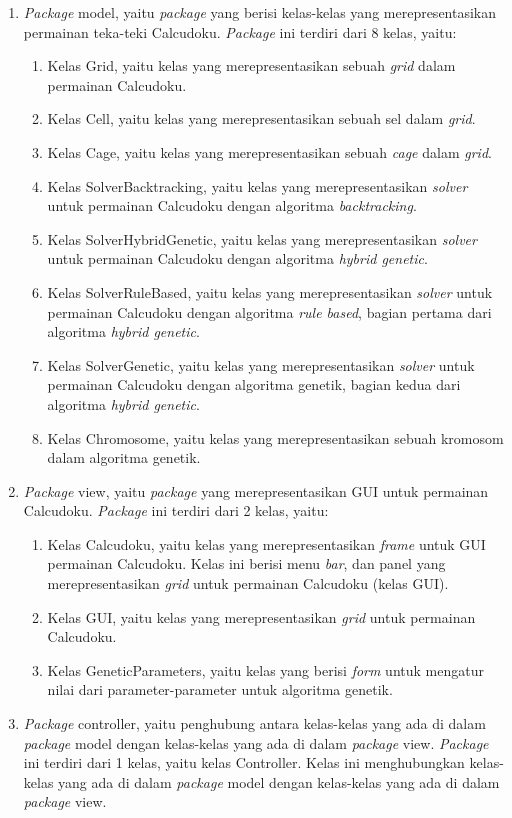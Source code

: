 \begin{enumerate}
\item \textit{Package} model, yaitu \textit{package} yang berisi kelas-kelas yang merepresentasikan permainan teka-teki Calcudoku. \textit{Package} ini terdiri dari 8 kelas, yaitu:
	\begin{enumerate}
	\item Kelas Grid, yaitu kelas yang merepresentasikan sebuah \textit{grid} dalam permainan Calcudoku.
	\item Kelas Cell, yaitu kelas yang merepresentasikan sebuah sel dalam \textit{grid}.
	\item Kelas Cage, yaitu kelas yang merepresentasikan sebuah \textit{cage} dalam \textit{grid}.
	\item Kelas SolverBacktracking, yaitu kelas yang merepresentasikan \textit{solver} untuk permainan Calcudoku dengan algoritma \textit{backtracking}.
	\item Kelas SolverHybridGenetic, yaitu kelas yang merepresentasikan \textit{solver} untuk permainan Calcudoku dengan algoritma \textit{hybrid genetic}.
	\item Kelas SolverRuleBased, yaitu kelas yang merepresentasikan \textit{solver} untuk permainan Calcudoku dengan algoritma \textit{rule based}, bagian pertama dari algoritma \textit{hybrid genetic}.
	\item Kelas SolverGenetic, yaitu kelas yang merepresentasikan \textit{solver} untuk permainan Calcudoku dengan algoritma genetik, bagian kedua dari algoritma \textit{hybrid genetic}.
	\item Kelas Chromosome, yaitu kelas yang merepresentasikan sebuah kromosom dalam algoritma genetik.
	\end{enumerate}
\item \textit{Package} view, yaitu \textit{package} yang merepresentasikan GUI untuk permainan Calcudoku. \textit{Package} ini terdiri dari 2 kelas, yaitu:
	\begin{enumerate}
	\item Kelas Calcudoku, yaitu kelas yang merepresentasikan \textit{frame} untuk GUI permainan Calcudoku. Kelas ini berisi menu \textit{bar}, dan panel yang merepresentasikan \textit{grid} untuk permainan Calcudoku (kelas GUI).
	\item Kelas GUI, yaitu kelas yang merepresentasikan \textit{grid} untuk permainan Calcudoku.
	\item Kelas GeneticParameters, yaitu kelas yang berisi \textit{form} untuk mengatur nilai dari parameter-parameter untuk algoritma genetik.
	\end{enumerate}
\item \textit{Package} controller, yaitu penghubung antara kelas-kelas yang ada di dalam \textit{package} model dengan kelas-kelas yang ada di dalam \textit{package} view. \textit{Package} ini terdiri dari 1 kelas, yaitu kelas Controller. Kelas ini menghubungkan kelas-kelas yang ada di dalam \textit{package} model dengan kelas-kelas yang ada di dalam \textit{package} view.
\end{enumerate}

